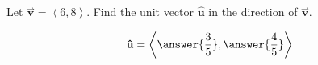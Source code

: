 \documentclass{ximera}
\author{Gregory Hartman \and Matthew Carr}
\begin{document}
\begin{exercise}
Let $\overset{\boldsymbol{\rightharpoonup}}{\mathbf{v}}  = \left\langle 6,8 \right\rangle$. Find the unit vector $\mathbf{\hat{u}}$ in the
direction of $\overset{\boldsymbol{\rightharpoonup}}{\mathbf{v}} $.
\begin{prompt}
\[
\mathbf{\hat{u}} = \left\langle \answer{\frac{3}{5}},\answer{\frac{4}{5}} \right\rangle
\]
\end{prompt}

\end{exercise}
\end{document}
